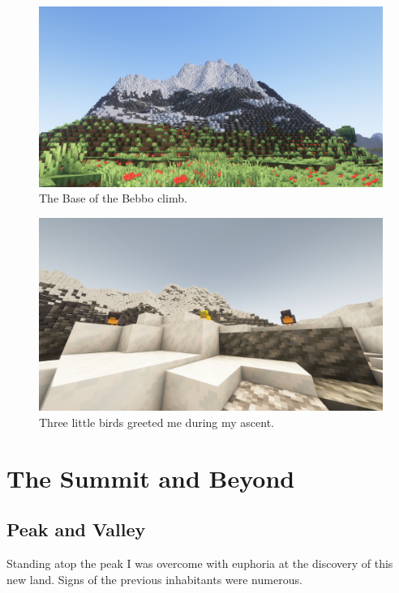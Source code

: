 \begin{figure}
    \centering
    \includegraphics[width=1.1\textwidth]{Bebbo In Full.png}
    \caption{The Base of the Bebbo climb.}

\end{figure}

\begin{figure}
    \centering
    \includegraphics[width=1\linewidth]{3 Little Birds Guide me up the Base.png}
    \caption{Three little birds greeted me during my ascent.}
\end{figure}

\chapter{The Summit and Beyond}

\section{Peak and Valley}

\large
Standing atop the peak I was overcome with euphoria at the discovery of this new land. Signs of the previous inhabitants were numerous. 

